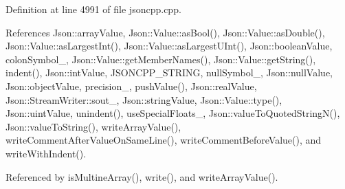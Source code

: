 Definition at line 4991 of file jsoncpp.\+cpp.



References Json\+::array\+Value, Json\+::\+Value\+::as\+Bool(), Json\+::\+Value\+::as\+Double(), Json\+::\+Value\+::as\+Largest\+Int(), Json\+::\+Value\+::as\+Largest\+U\+Int(), Json\+::boolean\+Value, colon\+Symbol\+\_\+, Json\+::\+Value\+::get\+Member\+Names(), Json\+::\+Value\+::get\+String(), indent(), Json\+::int\+Value, J\+S\+O\+N\+C\+P\+P\+\_\+\+S\+T\+R\+I\+NG, null\+Symbol\+\_\+, Json\+::null\+Value, Json\+::object\+Value, precision\+\_\+, push\+Value(), Json\+::real\+Value, Json\+::\+Stream\+Writer\+::sout\+\_\+, Json\+::string\+Value, Json\+::\+Value\+::type(), Json\+::uint\+Value, unindent(), use\+Special\+Floats\+\_\+, Json\+::value\+To\+Quoted\+String\+N(), Json\+::value\+To\+String(), write\+Array\+Value(), write\+Comment\+After\+Value\+On\+Same\+Line(), write\+Comment\+Before\+Value(), and write\+With\+Indent().



Referenced by is\+Multine\+Array(), write(), and write\+Array\+Value().


